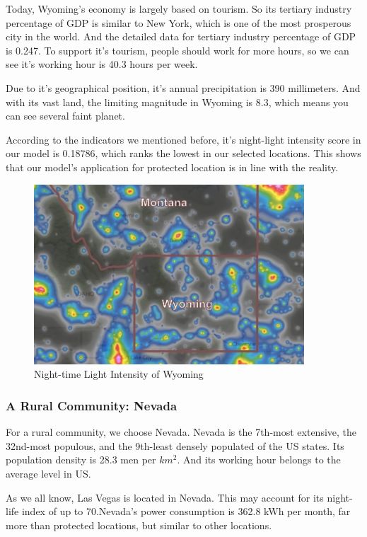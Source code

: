Today, Wyoming's economy is largely based on tourism. So its tertiary industry percentage of GDP is similar to New York, which is one of the most prosperous city in the world. And the detailed data for tertiary industry percentage of GDP is 0.247. To support it's tourism, people should work for more hours, so we can see it's working hour is 40.3 hours per week.

Due to it's geographical position, it's annual precipitation is 390 millimeters. And with its vast land, the limiting magnitude in Wyoming is 8.3, which means you can see several faint planet.

According to the indicators we mentioned before, it's night-light intensity score in our model is 0.18786, which ranks the lowest in our selected locations. This shows that our model's application for protected location is in line with the reality.
\begin{figure}[H]\centering
    \includegraphics[width=0.9\textwidth]{figures/texted/Wyoming_new.jpg}
    \caption{Night-time Light Intensity of Wyoming} \label{fig:figure3}
\end{figure}


\subsubsection{A Rural Community: Nevada}
For a rural community, we choose Nevada. Nevada is the 7th-most extensive, the 32nd-most populous, and the 9th-least densely populated of the US states. Its population density is 28.3 men per $km^2$. And its working hour belongs to the average level in US.

As we all know, Las Vegas is located in Nevada. This may account for its night-life index of up to 70.Nevada's power consumption is 362.8 kWh per month, far more than protected locations, but similar to other locations.

